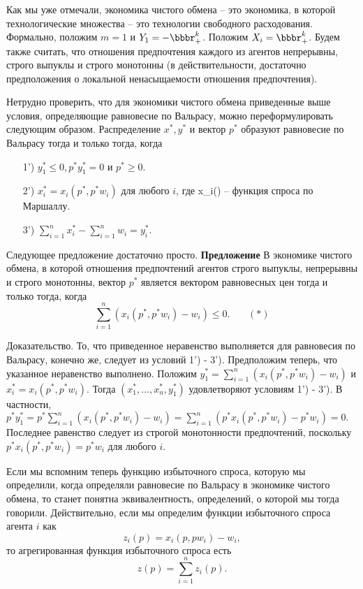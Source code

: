 Как мы уже отмечали, экономика чистого обмена -- это экономика, в которой технологические множества
-- это технологии свободного расходования. Формально, положим $m=1$ и $Y_1=-\bbbr^k_+$. Положим
$X_i=\bbbr^k_+$. Будем также считать, что отношения предпочтения каждого из агентов непрерывны,
строго выпуклы и строго монотонны (в действительности, достаточно предположения о локальной
ненасыщаемости отношения предпочтения).

Нетрудно проверить, что для экономики чистого обмена приведенные выше условия,
определяющие равновесие по Вальрасу,
можно переформулировать следующим образом.
Распределение $x^*,y^*$  и вектор $p^*$ образуют равновесие по Вальрасу тогда и только тогда, когда
\begin{itemize}
\item[1')] $y^*_1\leq0, p^*y^*_1=0$ и $p^*\geq0.$
\item[2')] $x^*_i=x_i(p^*,p^*w_i)$ для любого $i$, где x_i(\cdot) -- функция спроса по Маршаллу.
\item[3')] $\sum^n_{i=1}x^*_i-\sum^n_{i=1}w_i=y^*_i.$
\end{itemize}

Следующее предложение достаточно просто.
\textbf{Предложение} В
экономике чистого обмена, в которой отношения предпочтений агентов
строго выпуклы, непрерывны и строго монотонны, вектор $p^*$
является вектором равновесных цен тогда и только тогда, когда
$$\sum^n_{i=1}(x_i(p^*,p^*w_i)-w_i)\leq0.\,\,\,\,\,\,\,\,\,\,\,(*)$$

Доказательство. То, что приведенное неравенство выполняется для равновесия по Вальрасу,
конечно же, следует из условий 1') - 3'). Предположим теперь, что указанное неравенство
выполнено. Положим $y^*_1=\sum^n_{i=1}(x_i(p^*,p^*w_i)-w_i)$ и $x^*_i=x_i(p^*,p^*w_i).$
Тогда $(x^*_1,\ldots,x^*_n,y^*_1)$ удовлетворяют условиям 1') - 3'). В частности,
$p^*y^*_1=p^*\sum^n_{i=1}(x_i(p^*,p^*w_i)-w_i)=\sum^n_{i=1}(p^*x_i(p^*,p^*w_i)-p^*w_i)=0.$
Последнее равенство следует из строгой монотонности предпочтений, поскольку
$p^*x_i(p^*,p^*w_i)=p^*w_i$ для любого $i$.

Если мы вспомним теперь функцию избыточного спроса, которую мы определили, когда
определяли равновесие по Вальрасу в экономике чистого обмена, то станет понятна
эквивалентность, определений, о которой мы тогда говорили.
Действительно, если мы определим функции избыточного спроса агента $i$ как
$$z_i(p)=x_i(p,pw_i)-w_i,$$
то агрегированная функция избыточного спроса есть
$$z(p)=\sum^n_{i=1}z_i(p).$$

